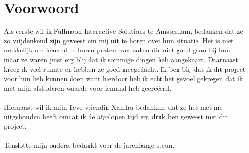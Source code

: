 \chapter*{Voorwoord} 

Als eerste wil ik Fullmoon Interactive Solutions te Amsterdam, bedanken dat ze zo vrijdenkend zijn geweest om mij uit te horen over hun situatie. Het is niet makkelijk om iemand te horen praten over zaken die niet goed gaan bij hun, maar ze waren juist erg blij dat ik sommige dingen heb aangekaart. Daarnaast kreeg ik veel ruimte en hebben ze goed meegedacht. Ik ben blij dat ik dit project voor hun heb kunnen doen want hierdoor heb ik echt het gevoel gekregen dat ik met mijn afstuderen waarde voor iemand heb gecreëerd.
\\\\
Hiernaast wil ik mijn lieve vriendin Xandra bedanken, dat ze het met me uitgehouden heeft omdat ik de afgelopen tijd erg druk ben geweest met dit project.
\\\\
Tenslotte mijn ouders, bedankt voor de jarenlange steun.
